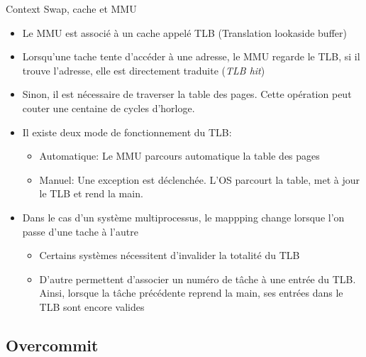 \begin{frame}[fragile=singleslide]{Context Swap, cache et MMU}
  \begin{itemize}
  \item  Le  MMU est  associé  à  un  cache appelé  TLB  (Translation
    lookaside buffer)
  \item  Lorsqu'une  tache tente  d'accéder  à  une  adresse, le  MMU
    regarde  le TLB,  si il  trouve l'adresse,  elle  est directement
    traduite (\emph{TLB hit})
  \item  Sinon,   il  est  nécessaire   de  traverser  la   table  des
    pages.  Cette  opération  peut   couter  une  centaine  de  cycles
    d'horloge.
  \item Il existe deux mode de fonctionnement du TLB:
    \begin{itemize}
    \item Automatique: Le MMU parcours automatique la table des pages
    \item  Manuel: Une  exception  est déclenchée.   L'OS parcourt  la
      table, met à jour le TLB et rend la main.
    \end{itemize}
  \item Dans  le cas d'un  système multiprocessus, le  mappping change
    lorsque l'on passe d'une tache à l'autre
    \begin{itemize}
    \item  Certains systèmes nécessitent  d'invalider la  totalité du
      TLB
    \item  D'autre permettent  d'associer  un numéro  de  tâche à  une
      entrée  du TLB. Ainsi,  lorsque la  tâche précédente  reprend la
      main, ses entrées dans le TLB sont encore valides
    \end{itemize}
  \end{itemize}
\end{frame}

\subsection{Overcommit}

